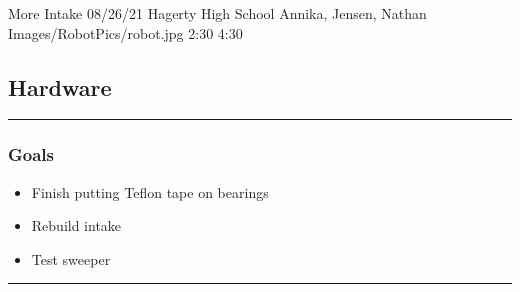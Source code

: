 \insertmeeting 
	{More Intake} 
	{08/26/21}
	{Hagerty High School}
	{Annika, Jensen, Nathan}
	{Images/RobotPics/robot.jpg}
	{2:30}
  {4:30}
	
\subsection*{Hardware}
\noindent\hfil\rule{\textwidth}{.4pt}\hfil
\subsubsection*{Goals}
\begin{itemize}
    \item Finish putting Teflon tape on bearings
	\item Rebuild intake
	\item Test sweeper
  

\end{itemize} 

\noindent\hfil\rule{\textwidth}{.4pt}\hfil


